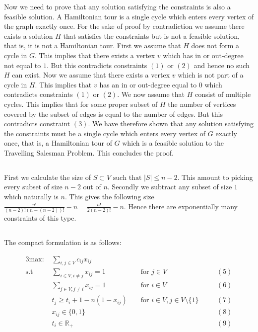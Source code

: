 Now we need to prove that any solution satisfying the constraints is also a feasible solution. A Hamiltonian tour is a single cycle which enters every vertex of the graph exactly once. For the sake of proof by contradiction we assume there exists a solution $H$ that satisfies the constraints but is not a feasible solution, that is, it is not a Hamiltonian tour. First we assume that $H$ does not form a cycle in $G$. This implies that there exists a vertex $v$ which has in or out-degree not equal to $1$. But this contradicts constraints $(1)$ or $(2)$ and hence no such $H$ can exist. Now we assume that there exists a vertex $v$ which is not part of a cycle in $H$. This implies that $v$ has an in or out-degree equal to $0$ which contradicts constraints $(1)$ or $(2)$. We now assume that $H$ consist of multiple cycles. This implies that for some proper subset of $H$ the number of vertices covered by the subset of edges is equal to the number of edges. But this contradicts constraint $(3)$. We have therefore shown that any solution satisfying the constraints must be a single cycle which enters every vertex of $G$ exactly once, that is, a Hamiltonian tour of $G$ which is a feasible solution to the Travelling Salesman Problem. This concludes the proof.

\subsection{}  %
First we calculate the size of $S \subset V \text{ such that } |S| \leq n - 2$. This amount to picking every subset of size $n-2$ out of $n$. Secondly we subtract any subset of size $1$ which naturally is $n$. This gives the following size $\frac{n!}{(n-2)! (n - (n-2))!}-n = \frac{n!}{2 (n-2)!}-n$. Hence there are exponentially many constraints of this type. 


\subsection{} %

The compact formulation is as follows:

\begin{alignat*}{3}
	\text{max: }    & \sum_{i,j \in V} c_{ij} x_{ij}\\
	\text{s.t }     & \sum_{i \in V, i \neq j} x_{ij} = 1  && \text{ for } j \in V && (5)\\
	& \sum_{j \in V, j \neq i} x_{ij} = 1  && \text{ for } i \in V && (6)\\
	& t_j \geq t_i + 1-n(1-x_{ij})  && \text{ for } i \in V, j \in V \setminus \{1\} \quad && (7)\\
	& x_{ij} \in \{0,1\} && && (8)\\
	& t_i \in \mathbb{R}_+ && && (9)
\end{alignat*}

